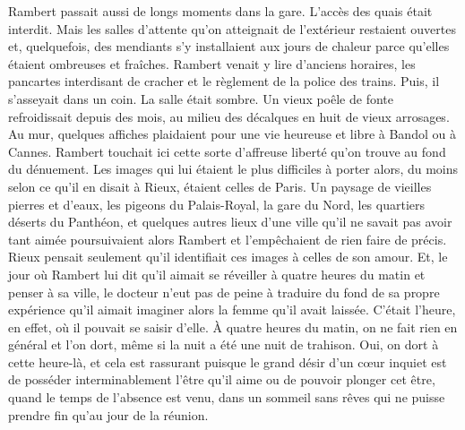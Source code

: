\documentclass[french,twoside]{book} %
\begin{document}
Rambert passait aussi de longs moments dans la gare. L’accès des quais était interdit. Mais les salles d’attente qu’on atteignait de l’extérieur restaient ouvertes et, quelquefois, des mendiants s’y installaient aux jours de chaleur parce qu’elles étaient ombreuses et fraîches. Rambert venait y lire d’anciens horaires, les pancartes interdisant de cracher et le règlement de la police des trains. Puis, il s’asseyait dans un coin. La salle était sombre. Un vieux poêle de fonte refroidissait depuis des mois, au milieu des décalques en huit de vieux arrosages. Au mur, quelques affiches plaidaient pour une vie heureuse et libre à Bandol ou à Cannes. Rambert touchait ici cette sorte d’affreuse liberté qu’on trouve au fond du dénuement. Les images qui lui étaient le plus difficiles à porter alors, du moins selon ce qu’il en disait à Rieux, étaient celles de Paris. Un paysage de vieilles pierres et d’eaux, les pigeons du Palais-Royal, la gare du Nord, les quartiers déserts du Panthéon, et quelques autres lieux d’une ville qu’il ne savait pas avoir tant aimée poursuivaient alors Rambert et l’empêchaient de rien faire de précis. Rieux pensait seulement qu’il identifiait ces images à celles de son amour. Et, le jour où Rambert lui dit qu’il aimait se réveiller à quatre heures du matin et penser à sa ville, le docteur n’eut pas de peine à traduire du fond de sa propre expérience qu’il aimait imaginer alors la femme qu’il avait laissée. C’était l’heure, en effet, où il pouvait se saisir d’elle. À quatre heures du matin, on ne fait rien en général et l’on dort, même si la nuit a été une nuit de trahison. Oui, on dort à cette heure-là, et cela est rassurant puisque le grand désir d’un cœur inquiet est de posséder interminablement l’être qu’il aime ou de pouvoir plonger cet être, quand le temps de l’absence est venu, dans un sommeil sans rêves qui ne puisse prendre fin qu’au jour de la réunion.
\end{document}

